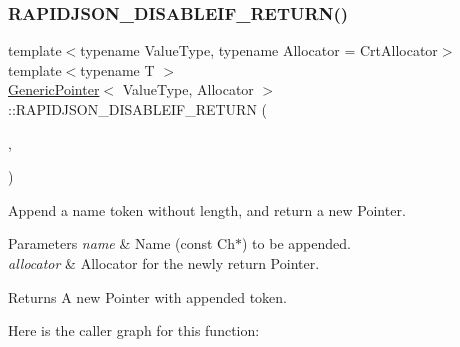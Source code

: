 \subsubsection{\texorpdfstring{R\+A\+P\+I\+D\+J\+S\+O\+N\+\_\+\+D\+I\+S\+A\+B\+L\+E\+I\+F\+\_\+\+R\+E\+T\+U\+R\+N()}{RAPIDJSON\_DISABLEIF\_RETURN()}\hspace{0.1cm}{\footnotesize\ttfamily [1/3]}}
{\footnotesize\ttfamily template$<$typename Value\+Type, typename Allocator = Crt\+Allocator$>$ \\
template$<$typename T $>$ \\
\hyperlink{class_generic_pointer}{Generic\+Pointer}$<$ Value\+Type, Allocator $>$\+::R\+A\+P\+I\+D\+J\+S\+O\+N\+\_\+\+D\+I\+S\+A\+B\+L\+E\+I\+F\+\_\+\+R\+E\+T\+U\+RN (\begin{DoxyParamCaption}\item[{(internal\+::\+Not\+Expr$<$ internal\+::\+Is\+Same$<$ typename internal\+::\+Remove\+Const$<$ T $>$\+::\hyperlink{rapidjson_8h_a1d1cfd8ffb84e947f82999c682b666a7}{Type}, \hyperlink{class_generic_pointer_ab292356c11b4015c98d21b966b11f285}{Ch} $>$ $>$)}]{,  }\item[{(\hyperlink{class_generic_pointer}{Generic\+Pointer}$<$ Value\+Type, Allocator $>$)}]{ }\end{DoxyParamCaption})}



Append a name token without length, and return a new Pointer. 


\begin{DoxyParams}{Parameters}
{\em name} & Name (const Ch$\ast$) to be appended. \\
\hline
{\em allocator} & Allocator for the newly return Pointer. \\
\hline
\end{DoxyParams}
\begin{DoxyReturn}{Returns}
A new Pointer with appended token. 
\end{DoxyReturn}
Here is the caller graph for this function\+:
\mbox{\label{class_generic_pointer_a914bbdd96e2a248e035b8ebd68526369}} 
